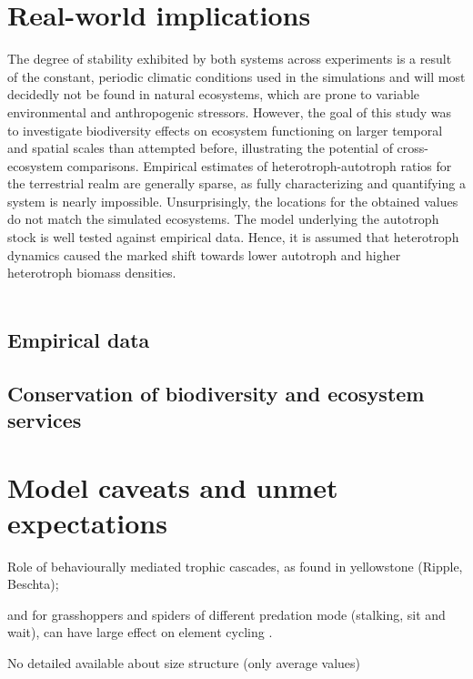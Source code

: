 \section{Real-world implications}
%
The degree of stability exhibited by both systems across experiments is a result of the constant, periodic climatic conditions used in the simulations and will most decidedly not be found in natural ecosystems, which are prone to variable environmental and anthropogenic stressors. However, the goal of this study was to investigate biodiversity effects on ecosystem functioning on larger temporal and spatial scales than attempted before, illustrating the potential of cross-ecosystem comparisons.
Empirical estimates of heterotroph-autotroph ratios for the terrestrial realm are generally sparse, as fully characterizing and quantifying a system is nearly impossible. 
Unsurprisingly, the locations for the obtained values do not match the simulated ecosystems. The model \citep{Smith2012}underlying the autotroph stock is well tested against empirical data. Hence, it is assumed that heterotroph dynamics caused the marked shift towards lower autotroph and higher heterotroph biomass densities.\\\\
\subsection{Empirical data}
%
\subsection{Conservation of biodiversity and ecosystem services}

\section{Model caveats and unmet expectations}
Role of behaviourally mediated trophic cascades,  as found in yellowstone (Ripple, Beschta);

 and for grasshoppers and spiders of different predation mode (stalking, sit and wait), can have large effect on element cycling \cite{Schmitz2015}.
 
No detailed available about size structure (only average values)